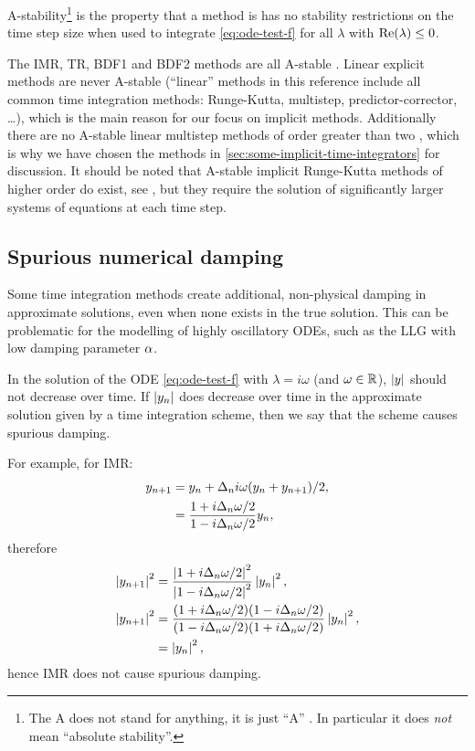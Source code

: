 A-stability\footnote{The A does not stand for anything, it is just ``A'' \cite[40]{HairerWanner}. In particular it does \emph{not} mean ``absolute stability''.} is the property that a method is has no stability restrictions on the time step size when used to integrate \cref{eq:ode-test-f} for all $\lambda$ with $\operatorname{Re}(\lambda) \leq 0$.

The IMR, TR, BDF1 and BDF2 methods are all A-stable \cite[pgs. 43, 251]{HairerWanner}.
Linear explicit methods are never A-stable \cite{Nevanlinna1974} (``linear'' methods in this reference include all common time integration methods: Runge-Kutta, multistep, predictor-corrector, \ldots), which is the main reason for our focus on implicit methods.
Additionally there are no A-stable linear multistep methods of order greater than two \cite[261]{GreshoSani}, which is why we have chosen the  methods in \cref{sec:some-implicit-time-integrators} for discussion.
It should be noted that A-stable implicit Runge-Kutta methods of higher order do exist, see \eg \cite[73]{HairerWanner}, but they require the solution of significantly larger systems of equations at each time step.

\subsection{Spurious numerical damping}
\label{sec:numerical-damping}

Some time integration methods create additional, non-physical damping in approximate solutions, even when none exists in the true solution.
This can be problematic for the modelling of highly oscillatory ODEs, such as the LLG with low damping parameter $\alpha$.

In the solution of the ODE \cref{eq:ode-test-f} with $\lambda = i\omega$ (and $\omega \in \mathbb{R}$), $\left|{y} \right|$ should not decrease over time.
If $\left|{y_n} \right|$ does decrease over time in the approximate solution given by a time integration scheme, then we say that the scheme causes spurious damping.

For example, for IMR:
\begin{equation}
  \begin{aligned}
    y_{n+1} &= y_n + \Delta_{n} i \omega (y_n + y_{n+1})/2, \\
    &= \frac{1 + i\Delta_{n} \omega/2}{1 - i\Delta_{n} \omega/2} y_n,
  \end{aligned}
\end{equation}
therefore
\begin{equation}
  \begin{aligned}
    \left|{y_{n+1}} \right|^2 &=  \frac{\left|{1 + i\Delta_{n} \omega/2} \right|^2}{\left|{1 - i\Delta_{n} \omega/2} \right|^2} \left|{y_n} \right|^2, \\
    \left|{y_{n+1}} \right|^2 &=  \frac{(1 + i\Delta_{n} \omega/2)(1 - i\Delta_{n} \omega/2)}
    {(1 - i\Delta_{n} \omega/2)(1 + i\Delta_{n} \omega/2)} \left|{y_n} \right|^2, \\
    &=  \left|{y_n} \right|^2,
  \end{aligned}
\end{equation}
hence IMR does not cause spurious damping.

